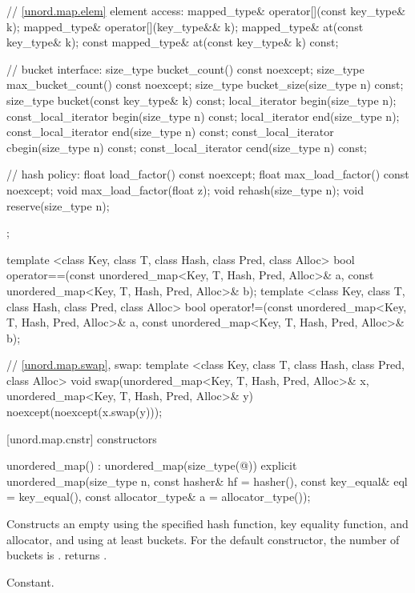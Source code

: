 \begin{codeblock}
{{    // \ref{unord.map.elem} element access:
    mapped_type& operator[](const key_type& k);
    mapped_type& operator[](key_type&& k);
    mapped_type& at(const key_type& k);
    const mapped_type& at(const key_type& k) const;

    // bucket interface:
    size_type bucket_count() const noexcept;
    size_type max_bucket_count() const noexcept;
    size_type bucket_size(size_type n) const;
    size_type bucket(const key_type& k) const;
    local_iterator begin(size_type n);
    const_local_iterator begin(size_type n) const;
    local_iterator end(size_type n);
    const_local_iterator end(size_type n) const;
    const_local_iterator cbegin(size_type n) const;
    const_local_iterator cend(size_type n) const;

    // hash policy:
    float load_factor() const noexcept;
    float max_load_factor() const noexcept;
    void max_load_factor(float z);
    void rehash(size_type n);
    void reserve(size_type n);
  };

  template <class Key, class T, class Hash, class Pred, class Alloc>
    bool operator==(const unordered_map<Key, T, Hash, Pred, Alloc>& a,
                    const unordered_map<Key, T, Hash, Pred, Alloc>& b);
  template <class Key, class T, class Hash, class Pred, class Alloc>
    bool operator!=(const unordered_map<Key, T, Hash, Pred, Alloc>& a,
                    const unordered_map<Key, T, Hash, Pred, Alloc>& b);

  // \ref{unord.map.swap}, swap:
  template <class Key, class T, class Hash, class Pred, class Alloc>
    void swap(unordered_map<Key, T, Hash, Pred, Alloc>& x,
              unordered_map<Key, T, Hash, Pred, Alloc>& y)
      noexcept(noexcept(x.swap(y)));
}
\end{codeblock}

[unord.map.cnstr]{ constructors}

%
\begin{itemdecl}
unordered_map() : unordered_map(size_type(@\seebelow@)) { }
explicit unordered_map(size_type n,
                       const hasher& hf = hasher(),
                       const key_equal& eql = key_equal(),
                       const allocator_type& a = allocator_type());
\end{itemdecl}

\begin{itemdescr}
\pnum
\effects Constructs an empty  using the
specified hash function, key equality function, and allocator, and
using at least  buckets.  For the default constructor,
the number of buckets is .
 returns .

\pnum
\complexity Constant.
\end{itemdescr}


